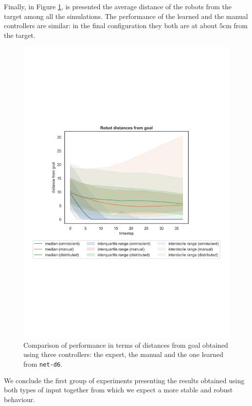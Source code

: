 \bigskip
Finally, in Figure \ref{fig:net-d6distance}, is presented the average distance of the 
robots from the target among all the simulations. The performance of the learned 
and the manual controllers are similar: in the final configuration they both are at 
about $5$\gls{cm} from the target. 
\begin{figure}[!htb]
	\centering
	\includegraphics[width=.65\textwidth]{contents/images/net-d6/distances-from-goal-compressed-distributed}%
		\caption[Evaluation of \texttt{net-d6} distances from goal.]{Comparison of 
		performance in terms of distances from goal obtained using three 
		controllers: the expert, the manual and the one learned from \texttt{net-d6}.}
	\label{fig:net-d6distance}
\end{figure}

We conclude the first group of experiments presenting the results obtained 
using both types of input together from which we expect a more stable and 
robust behaviour. 

